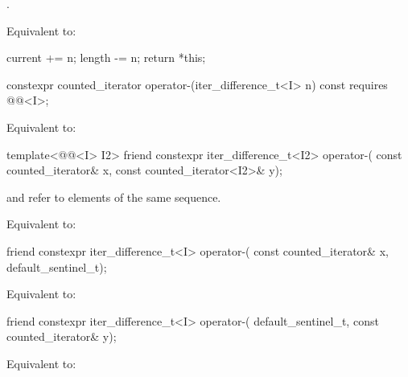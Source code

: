 \begin{itemdescr}
\pnum
\expects
{}.

\pnum
\effects
Equivalent to:
\begin{codeblock}
current += n;
length -= n;
return *this;
\end{codeblock}
\end{itemdescr}

%
\begin{itemdecl}
  constexpr counted_iterator operator-(iter_difference_t<I> n) const
    requires @@<I>;
\end{itemdecl}

\begin{itemdescr}
\pnum
\effects
Equivalent to: 
\end{itemdescr}

%
\begin{itemdecl}
template<@@<I> I2>
  friend constexpr iter_difference_t<I2> operator-(
    const counted_iterator& x, const counted_iterator<I2>& y);
\end{itemdecl}

\begin{itemdescr}
\pnum
\expects
{} and  refer to elements of the same
sequence.

\pnum
\effects
Equivalent to: 
\end{itemdescr}

%
\begin{itemdecl}
friend constexpr iter_difference_t<I> operator-(
  const counted_iterator& x, default_sentinel_t);
\end{itemdecl}

\begin{itemdescr}
\pnum
\effects
Equivalent to:
\end{itemdescr}

%
\begin{itemdecl}
friend constexpr iter_difference_t<I> operator-(
  default_sentinel_t, const counted_iterator& y);
\end{itemdecl}

\begin{itemdescr}
\pnum
\effects
Equivalent to: 
\end{itemdescr}

